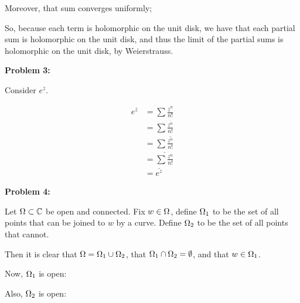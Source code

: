 \documentclass[a4paper,12pt]{article}
\begin{document}
Moreover, that sum converges uniformly; %

So, because each term is holomorphic on the unit disk, we have that each partial sum is holomorphic on the unit disk, and thus the limit of the partial sums is holomorphic on the unit disk, by Weierstrauss.

\shunt

{\bf Problem 3:}

Consider $e^{\overline{z}}$. 

\begin{align*}
e^{\overline{z}} &= \sum \frac{\overline{z}^n}{n!} \\
&= \sum \frac{\overline{z^n}}{n!}\\
&= \sum \overline{\frac{z^n}{n!}}\\
&= \overline{\sum\frac{z^n}{n!}}\\
&= \overline{e^z}
\end{align*}

\shunt

{\bf Problem 4:}

Let $\Omega \subset \mathbb{C}$ be open and connected. Fix $w \in \Omega$, define $\Omega_1$ to be the set of all points that can be joined to $w$ by a curve. Define $\Omega_2$ to be the set of all points that cannot.

Then it is clear that $\Omega=\Omega_1 \cup \Omega_2$, that $\Omega_1 \cap \Omega_2 = \emptyset$, and that $w \in \Omega_1$.

Now, $\Omega_1$ is open: %

Also, $\Omega_2$ is open: %

\shunt
\end{document}
